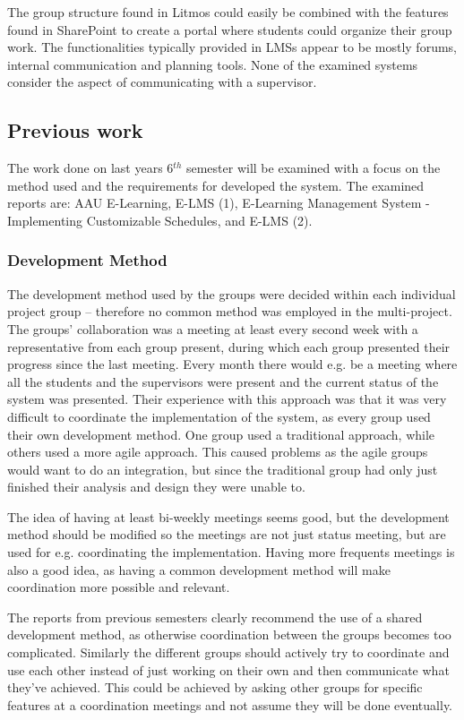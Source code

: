 The group structure found in Litmos could easily be combined with the features found in SharePoint to create a portal where students could organize their group work.
The functionalities typically provided in LMSs appear to be mostly forums, internal communication and planning tools.
None of the examined systems consider the aspect of communicating with a supervisor.

\subsection{Previous work}
The work done on last years 6$^{th}$ semester will be examined with a focus on the method used and the requirements for developed the system. 
The examined reports are: AAU E-Learning, E-LMS (1), E-Learning Management System - Implementing Customizable Schedules, and E-LMS (2).


\subsubsection{Development Method}
The development method used by the groups were decided within each individual project group -- therefore no common method was employed in the multi-project.
The groups' collaboration was a meeting at least every second week with a representative from each group present, during which each group presented their progress since the last meeting.
Every month there would	e.g. be a meeting where all the students and the supervisors were present and the current status of the system was presented.
Their experience with this approach was that it was very difficult to coordinate the implementation of the system, as every group used their own development method. 
One group used a traditional approach, while others used a more agile approach.
This caused problems as the agile groups would want to do an integration, but since the traditional group had only just finished their analysis and design they were unable to.

The idea of having at least bi-weekly meetings seems good, but the development method should be modified so the meetings are not just status meeting, but are used for e.g. coordinating the implementation.
Having more frequents meetings is also a good idea, as having a common development method will make coordination more possible and relevant.

The reports from previous semesters clearly recommend the use of a shared development method, as otherwise coordination between the groups becomes too complicated. Similarly the different groups should actively try to coordinate and use each other instead of just working on their own and then communicate what they've achieved. 
This could be achieved by asking other groups for specific features at a coordination meetings and not assume they will be done eventually.



